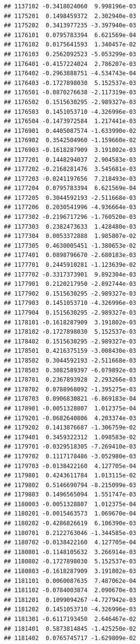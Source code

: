 \documentclass[ignorenonframetext,]{beamer}
\begin{document}
\begin{frame}[fragile]
\begin{verbatim}
## 1137102 -0.3418024060  9.998196e-03
## 1175201  0.1498459372  2.302940e-03
## 1175202  0.3413977235 -3.397940e-03
## 1176101  0.0795783394  6.621569e-04
## 1176102  0.0175641593  1.340457e-02
## 1176103  0.2562092523 -5.053299e-03
## 1176401 -0.4157224024  2.786207e-03
## 1176402 -0.2963888751 -4.534743e-04
## 1176403 -0.1727898030  5.152537e-03
## 1176501 -0.0870276638 -2.117319e-03
## 1176502  0.1515630295 -2.989327e-03
## 1176503  0.1451053710 -4.326996e-03
## 1176504 -0.1473972584  1.217441e-03
## 1176901  0.4405087574 -1.633990e-02
## 1176902  0.3542504960 -1.159660e-02
## 1176903 -0.1618287909  3.191802e-03
## 1177201  0.1448294037  2.904583e-03
## 1177202 -0.2168281476  3.545681e-03
## 1177203 -0.0241197656  7.218493e-03
## 1177204  0.0795783394  6.621569e-04
## 1177205  0.3044592193 -2.511668e-03
## 1177206  0.2030541996 -4.936664e-03
## 1177302 -0.2196717296 -1.760520e-03
## 1177303  0.2382473633  1.428480e-03
## 1177304  0.0053372888  1.985807e-02
## 1177305  0.4630005451 -1.380653e-02
## 1177401  0.0898796670 -2.680183e-03
## 1177701  0.2445910281 -1.123639e-02
## 1177702 -0.3317373901  9.892304e-03
## 1177901  0.2120217950 -2.892744e-03
## 1177902  0.1515630295 -2.989327e-03
## 1177903  0.1451053710 -4.326996e-03
## 1177904  0.1515630295 -2.989327e-03
## 1178101 -0.1618287909  3.191802e-03
## 1178102 -0.1727898030  5.152537e-03
## 1178402  0.1515630295 -2.989327e-03
## 1178501  0.4216375159 -3.008430e-03
## 1178502  0.3044592193 -2.511668e-03
## 1178503  0.3082589397 -6.079892e-03
## 1178701  0.2367893928  2.293266e-03
## 1178702  0.0788968092 -1.395275e-03
## 1178703  0.0906830821 -6.869183e-04
## 1178901 -0.0051328807  1.012375e-04
## 1179201 -0.0682640806  4.203374e-03
## 1179202  0.1413876687 -1.306759e-02
## 1179401  0.3459322312  1.098583e-02
## 1179701 -0.0329518305 -7.269410e-03
## 1179702  0.1117178486 -3.052980e-03
## 1179703 -0.0138422160  4.127705e-04
## 1179801  0.4243611784  1.013115e-02
## 1179802  0.5146690794 -8.215099e-03
## 1179803  0.1496565094  1.551747e-03
## 1180003 -0.0051328807  1.012375e-04
## 1180201 -0.0015463573  1.069670e-04
## 1180202 -0.4286826619  6.106390e-03
## 1180701  0.2122763046 -1.344585e-03
## 1180702 -0.0138422160  4.127705e-04
## 1180801 -0.1148105632  3.266914e-03
## 1180802 -0.1727898030  5.152537e-03
## 1180803 -0.1618287909  3.191802e-03
## 1181101  0.0060087635  7.487062e-04
## 1181102 -0.0784003874  2.090670e-03
## 1181201  0.1099094267 -4.727942e-03
## 1181202  0.1451053710 -4.326996e-03
## 1181301 -0.6117193450  2.646467e-02
## 1181401  0.5873814845 -1.425250e-02
## 1181402  0.0765745717 -1.629809e-02

\end{verbatim}
\end{frame}
\end{document}
